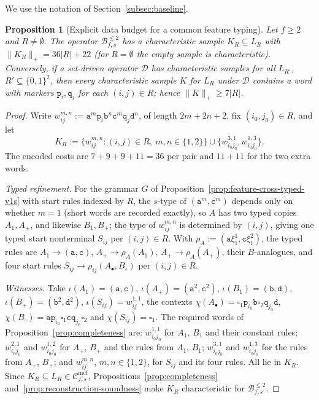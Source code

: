 \documentclass[11pt]{article}
\numberwithin{equation}{section}
\theoremstyle{plain}
\newtheorem{proposition}[theorem]{Proposition}
\theoremstyle{definition}
\theoremstyle{remark}
\newcommand{\Cmcf}[2]{\mathcal{C}^{\mathrm{mcf}}_{#1,#2}}
\newcommand{\blank}{\square}
\theoremstyle{plain}
\begin{document}
We use the notation of Section~\ref{subsec:baseline}.

\begin{proposition}[Explicit data budget for a common feature typing]
\label{prop:feature-family-witness-budget}
Let $f\ge2$ and $R\ne\emptyset$.  The operator $\mathcal B^{\le2}_{f,s}$ has a
characteristic sample $K_R\subseteq L_R$ with $\|K_R\|_+=36|R|+22$ (for
$R=\emptyset$ the empty sample is characteristic).  Conversely, if a set-driven
operator $\mathcal D$ has characteristic samples for \emph{all} $L_{R'}$,
$R'\subseteq\{0,1\}^2$, then every characteristic sample $K$ for $L_R$ under
$\mathcal D$ contains a word with markers $\mathtt p_i,\mathtt q_j$ for each
$(i,j)\in R$; hence $\|K\|_+\ge7|R|$.
\end{proposition}

\begin{proof}
Write $w^{m,n}_{ij}:=\mathtt a^m\mathtt p_i\mathtt b^n\mathtt c^m\mathtt q_j\mathtt d^n$,
of length $2m+2n+2$, fix $(i_0,j_0)\in R$, and let
\[
 K_R:=\{w^{m,n}_{ij}:(i,j)\in R,\ m,n\in\{1,2\}\}\cup
 \{w^{3,1}_{i_0j_0},w^{1,3}_{i_0j_0}\}.
\]
The encoded costs are $7+9+9+11=36$ per pair and $11+11$ for the two extra words.

\emph{Typed refinement.}  For the grammar $G$ of
Proposition~\ref{prop:feature-cross-typed-v1s} with start rules indexed by $R$, the
$s$-type of $(\mathtt a^m,\mathtt c^m)$ depends only on whether $m=1$ (short words
are recorded exactly), so $A$ has two typed copies $A_1,A_+$, and likewise $B_1,B_+$;
the type of $w^{m,n}_{ij}$ is determined by $(i,j)$, giving one typed start
nonterminal $S_{ij}$ per $(i,j)\in R$.  With $\rho_A:=(\mathtt a\xi_1^1,\mathtt c\xi_1^2)$, the typed rules are
$A_1\to(\mathtt a,\mathtt c)$, $A_+\to\rho_A(A_1)$, $A_+\to\rho_A(A_+)$,
their $B$-analogues, and four start rules $S_{ij}\to\rho_{ij}(A_\bullet,B_\circ)$ per
$(i,j)\in R$.

\emph{Witnesses.}  Take $\iota(A_1)=(\mathtt a,\mathtt c)$,
$\iota(A_+)=(\mathtt a^2,\mathtt c^2)$, $\iota(B_1)=(\mathtt b,\mathtt d)$,
$\iota(B_+)=(\mathtt b^2,\mathtt d^2)$, $\iota(S_{ij})=w^{1,1}_{ij}$, the contexts
$\chi(A_\bullet)=\blank_1\mathtt p_{i_0}\mathtt b\blank_2\mathtt q_{j_0}\mathtt d$,
$\chi(B_\circ)=\mathtt a\mathtt p_{i_0}\blank_1\mathtt c\mathtt q_{j_0}\blank_2$ and
$\chi(S_{ij})=\blank_1$.  The required words of
Proposition~\ref{prop:completeness} are: $w^{1,1}_{i_0j_0}$ for $A_1$, $B_1$ and their
constant rules; $w^{2,1}_{i_0j_0}$ and $w^{1,2}_{i_0j_0}$ for $A_+$, $B_+$ and the rules
from $A_1$, $B_1$; $w^{3,1}_{i_0j_0}$ and $w^{1,3}_{i_0j_0}$ for the rules from $A_+$,
$B_+$; and $w^{m,n}_{ij}$, $m,n\in\{1,2\}$, for $S_{ij}$ and its four rules.  All lie in
$K_R$.  Since $K_R\subseteq L_R\in\Cmcf{f}{s}$, Propositions~\ref{prop:completeness}
and~\ref{prop:reconstruction-soundness} make $K_R$ characteristic for
$\mathcal B^{\le2}_{f,s}$.


\end{proof}
\end{document}
